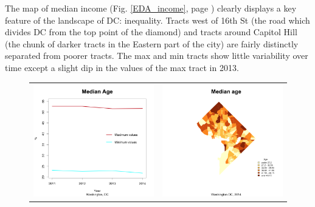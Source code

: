 \documentclass [a4paper,12 pt]{article}
\begin{document}
The map of median income (Fig. \ref{EDA_income}, page \pageref{EDA_income}) clearly displays a key feature of the landscape of DC: inequality. Tracts west of 16th St (the road which divides DC from the top point of the diamond) and tracts around Capitol Hill (the chunk of darker tracts in the Eastern part of the city) are fairly distinctly separated from poorer tracts. The max and min tracts show little variability over time except a slight dip in the values of the max tract in 2013. 

\begin{figure}[h!]
\begin{center}
\begin{tabular}{cc}
\includegraphics[viewport=5 0 660 600,clip,scale=0.33]{Figures/EDA_age.png}&
\includegraphics[viewport=10 0 660 600,clip,scale=0.33]{Figures/EDA_age_m.png}

\end{tabular}
\end{center}
\end{figure}
\end{document}

